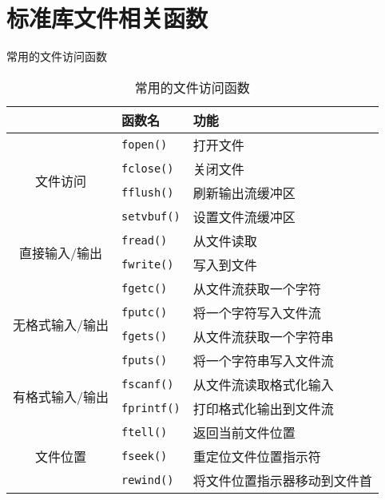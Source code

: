 \section{标准库文件相关函数}\label{sec:stdio}

\begin{frame}[fragile]{常用的文件访问函数}
    \begin{table}[]
        \small
        \begin{tabular}{|l|l|l|}
            \hline
            & 函数名 & 功能 \\ \hline
            \multicolumn{1}{|c|}{\multirow{4}{*}{文件访问}} & \texttt{fopen()} & 打开文件 \\ \cline{2-3}
            \multicolumn{1}{|c|}{} & \texttt{fclose()} & 关闭文件 \\ \cline{2-3}
            \multicolumn{1}{|c|}{} & \texttt{fflush()} & 刷新输出流缓冲区 \\ \cline{2-3}
            \multicolumn{1}{|c|}{} & \texttt{setvbuf()} & 设置文件流缓冲区 \\ \hline
            \multicolumn{1}{|c|}{\multirow{2}{*}{直接输入/输出}} & \texttt{fread()} & 从文件读取 \\ \cline{2-3}
            \multicolumn{1}{|c|}{} & \texttt{fwrite()} & 写入到文件 \\ \hline
            \multicolumn{1}{|c|}{\multirow{4}{*}{无格式输入/输出}} & \texttt{fgetc()} & 从文件流获取一个字符 \\ \cline{2-3}
            \multicolumn{1}{|c|}{} & \texttt{fputc()} & 将一个字符写入文件流 \\ \cline{2-3}
            \multicolumn{1}{|c|}{} & \texttt{fgets()} & 从文件流获取一个字符串 \\ \cline{2-3}
            \multicolumn{1}{|c|}{} & \texttt{fputs()} & 将一个字符串写入文件流 \\ \hline
            \multicolumn{1}{|c|}{\multirow{2}{*}{有格式输入/输出}} & \texttt{fscanf()} & 从文件流读取格式化输入 \\ \cline{2-3}
            \multicolumn{1}{|c|}{} & \texttt{fprintf()} & 打印格式化输出到文件流 \\ \hline
            \multicolumn{1}{|c|}{\multirow{3}{*}{文件位置}} & \texttt{ftell()} & 返回当前文件位置 \\ \cline{2-3}
            \multicolumn{1}{|c|}{} & \texttt{fseek()} & 重定位文件位置指示符 \\ \cline{2-3}
            \multicolumn{1}{|c|}{} & \texttt{rewind()} & 将文件位置指示器移动到文件首 \\ \hline
        \end{tabular}
        \caption{常用的文件访问函数}
    \end{table}
\end{frame}

